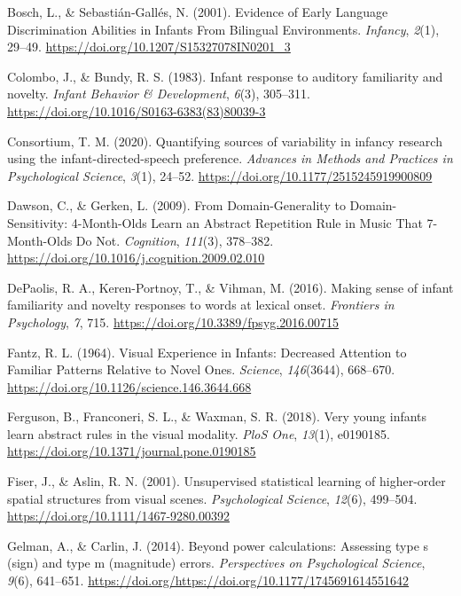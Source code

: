 \documentclass[english,man,man,floatsintext]{apa6}
\begin{document}
\leavevmode\hypertarget{ref-bosch2001}{}%
Bosch, L., \& Sebastián‐Gallés, N. (2001). Evidence of Early Language Discrimination Abilities in Infants From Bilingual Environments. \emph{Infancy}, \emph{2}(1), 29--49. \url{https://doi.org/10.1207/S15327078IN0201_3}

\leavevmode\hypertarget{ref-colombo1983}{}%
Colombo, J., \& Bundy, R. S. (1983). Infant response to auditory familiarity and novelty. \emph{Infant Behavior \& Development}, \emph{6}(3), 305--311. \url{https://doi.org/10.1016/S0163-6383(83)80039-3}

\leavevmode\hypertarget{ref-many-babies2020}{}%
Consortium, T. M. (2020). Quantifying sources of variability in infancy research using the infant-directed-speech preference. \emph{Advances in Methods and Practices in Psychological Science}, \emph{3}(1), 24--52. \url{https://doi.org/10.1177/2515245919900809}

\leavevmode\hypertarget{ref-dawson2009}{}%
Dawson, C., \& Gerken, L. (2009). From Domain-Generality to Domain-Sensitivity: 4-Month-Olds Learn an Abstract Repetition Rule in Music That 7-Month-Olds Do Not. \emph{Cognition}, \emph{111}(3), 378--382. \url{https://doi.org/10.1016/j.cognition.2009.02.010}

\leavevmode\hypertarget{ref-depaolis2016}{}%
DePaolis, R. A., Keren-Portnoy, T., \& Vihman, M. (2016). Making sense of infant familiarity and novelty responses to words at lexical onset. \emph{Frontiers in Psychology}, \emph{7}, 715. \url{https://doi.org/10.3389/fpsyg.2016.00715}

\leavevmode\hypertarget{ref-fantz1964}{}%
Fantz, R. L. (1964). Visual Experience in Infants: Decreased Attention to Familiar Patterns Relative to Novel Ones. \emph{Science}, \emph{146}(3644), 668--670. \url{https://doi.org/10.1126/science.146.3644.668}

\leavevmode\hypertarget{ref-ferguson2018}{}%
Ferguson, B., Franconeri, S. L., \& Waxman, S. R. (2018). Very young infants learn abstract rules in the visual modality. \emph{PloS One}, \emph{13}(1), e0190185. \url{https://doi.org/10.1371/journal.pone.0190185}

\leavevmode\hypertarget{ref-fiser2001}{}%
Fiser, J., \& Aslin, R. N. (2001). Unsupervised statistical learning of higher-order spatial structures from visual scenes. \emph{Psychological Science}, \emph{12}(6), 499--504. \url{https://doi.org/10.1111/1467-9280.00392}

\leavevmode\hypertarget{ref-gelman2014}{}%
Gelman, A., \& Carlin, J. (2014). Beyond power calculations: Assessing type s (sign) and type m (magnitude) errors. \emph{Perspectives on Psychological Science}, \emph{9}(6), 641--651. \url{https://doi.org/https://doi.org/10.1177/1745691614551642}
\end{document}
